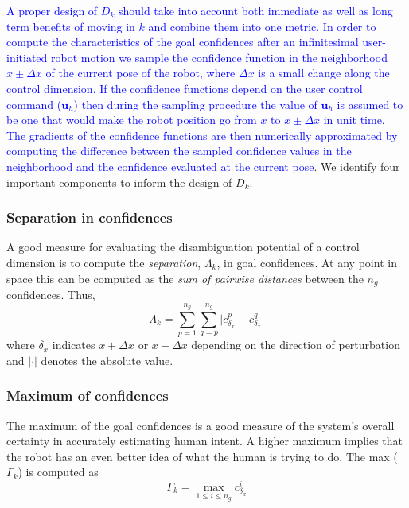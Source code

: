 \documentclass[conference]{IEEEtran}
\begin{document}
\textcolor{blue}{A proper design of $D_{k}$ should take into account both immediate as well as long term benefits of moving in $k$ and combine them into one metric. In order to compute the characteristics of the goal confidences after an infinitesimal user-initiated robot motion we sample the confidence function in the neighborhood $x\pm\Delta x$ of the current pose of the robot, where $\Delta x$ is a small change along the control dimension. If the confidence functions depend on the user control command ($\boldsymbol{u}_h$) then during the sampling procedure the value of $\boldsymbol{u}_h$ is assumed to be one that would make the robot position go from $x$ to $x\pm\Delta x$ in unit time. The gradients of the confidence functions are then numerically approximated by computing the difference between the sampled confidence values in the neighborhood and the confidence evaluated at the current pose}. We identify four important components to inform the design of $D_{k}$.

\subsubsection{Separation in confidences}
A good measure for evaluating the disambiguation potential of a control dimension is to compute the \textit{separation}, $\Lambda_{k}$, in goal confidences. At any point in space this can be computed as the \textit{sum of pairwise distances} between the $n_g$ confidences.  Thus,
\begin{equation*}
\Lambda_{k} = \sum_{p=1}^{n_g}\sum_{q=p}^{n_g}\lvert c^{p}_{\delta_x} - c^{q}_{\delta_x}\rvert
\end{equation*}
where $\delta_x$ indicates $x+\Delta x$ or $x-\Delta x$ depending on the direction of perturbation and $\lvert\cdot\rvert$ denotes the absolute value. 
\subsubsection{Maximum of confidences}
The maximum of the goal confidences is a good measure of the system's overall certainty in accurately estimating human intent. A higher maximum implies that the robot has an even better idea of what the human is trying to do. The max ($\Gamma_{k}$) is computed as
\begin{equation*}
\Gamma_{k} =\max\limits_{1 \leq i \leq n_g}c^{i}_{\delta_x}
\end{equation*}
\end{document}
